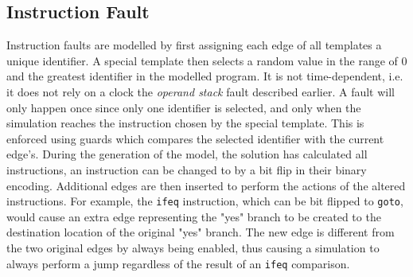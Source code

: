 \subsection{Instruction Fault}
Instruction faults are modelled by first assigning each edge of all templates a unique identifier. A special template then selects a random value in the range of $0$ and the greatest identifier in the modelled program. It is not time-dependent, i.e. it does not rely on a clock the \textit{operand stack} fault described earlier. A fault will only happen once since only one identifier is selected, and only when the simulation reaches the instruction chosen by the special template. This is enforced using guards which compares the selected identifier with the current edge's. During the generation of the model, the solution has calculated all instructions, an instruction can be changed to by a bit flip in their binary encoding. Additional edges are then inserted to perform the actions of the altered instructions. For example, the \texttt{ifeq} instruction, which can be bit flipped to \texttt{goto}, would cause an extra edge representing the "yes" branch to be created to the destination location of the original "yes" branch. The new edge is different from the two original edges by always being enabled, thus causing a simulation to always perform a jump regardless of the result of an \texttt{ifeq} comparison.

